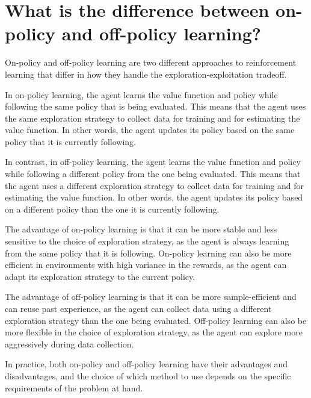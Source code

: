 \section{What is the difference between on-policy and off-policy learning?}
On-policy and off-policy learning are two different approaches to reinforcement learning that differ in how they handle the exploration-exploitation tradeoff.

In on-policy learning, the agent learns the value function and policy while following the same policy that is being evaluated. This means that the agent uses the same exploration strategy to collect data for training and for estimating the value function. In other words, the agent updates its policy based on the same policy that it is currently following.

In contrast, in off-policy learning, the agent learns the value function and policy while following a different policy from the one being evaluated. This means that the agent uses a different exploration strategy to collect data for training and for estimating the value function. In other words, the agent updates its policy based on a different policy than the one it is currently following.

The advantage of on-policy learning is that it can be more stable and less sensitive to the choice of exploration strategy, as the agent is always learning from the same policy that it is following. On-policy learning can also be more efficient in environments with high variance in the rewards, as the agent can adapt its exploration strategy to the current policy.

The advantage of off-policy learning is that it can be more sample-efficient and can reuse past experience, as the agent can collect data using a different exploration strategy than the one being evaluated. Off-policy learning can also be more flexible in the choice of exploration strategy, as the agent can explore more aggressively during data collection.

In practice, both on-policy and off-policy learning have their advantages and disadvantages, and the choice of which method to use depends on the specific requirements of the problem at hand.

